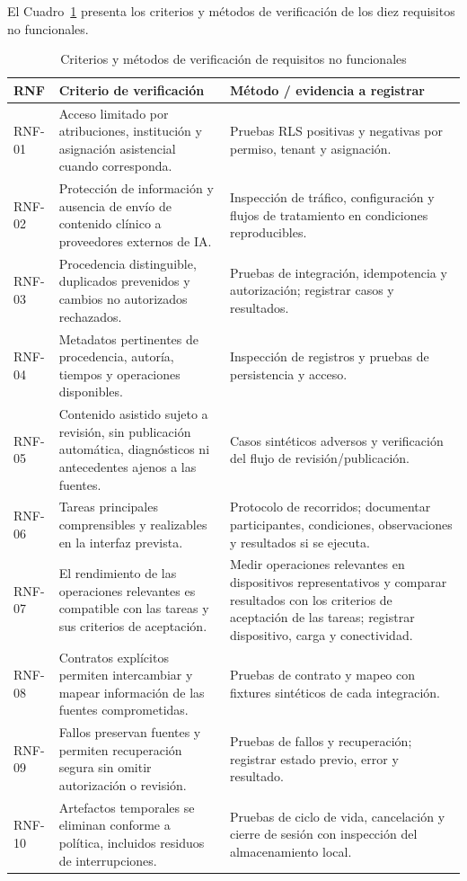 El Cuadro~\ref{tab:verificacion_rnf} presenta los criterios y métodos de verificación de los diez requisitos no funcionales.

\begin{table}[H]
    \caption{Criterios y métodos de verificación de requisitos no funcionales}
    \label{tab:verificacion_rnf}
    \begin{tabularx}{\textwidth}{|l|X|X|}
        \hline
        \textbf{RNF} & \textbf{Criterio de verificación} & \textbf{Método / evidencia a registrar} \\
        \hline
        RNF-01 & Acceso limitado por atribuciones, institución y asignación asistencial cuando corresponda. & Pruebas RLS positivas y negativas por permiso, tenant y asignación. \\
        \hline
        RNF-02 & Protección de información y ausencia de envío de contenido clínico a proveedores externos de IA. & Inspección de tráfico, configuración y flujos de tratamiento en condiciones reproducibles. \\
        \hline
        RNF-03 & Procedencia distinguible, duplicados prevenidos y cambios no autorizados rechazados. & Pruebas de integración, idempotencia y autorización; registrar casos y resultados. \\
        \hline
        RNF-04 & Metadatos pertinentes de procedencia, autoría, tiempos y operaciones disponibles. & Inspección de registros y pruebas de persistencia y acceso. \\
        \hline
        RNF-05 & Contenido asistido sujeto a revisión, sin publicación automática, diagnósticos ni antecedentes ajenos a las fuentes. & Casos sintéticos adversos y verificación del flujo de revisión/publicación. \\
        \hline
        RNF-06 & Tareas principales comprensibles y realizables en la interfaz prevista. & Protocolo de recorridos; documentar participantes, condiciones, observaciones y resultados si se ejecuta. \\
        \hline
        RNF-07 & El rendimiento de las operaciones relevantes es compatible con las tareas y sus criterios de aceptación. & Medir operaciones relevantes en dispositivos representativos y comparar resultados con los criterios de aceptación de las tareas; registrar dispositivo, carga y conectividad. \\
        \hline
        RNF-08 & Contratos explícitos permiten intercambiar y mapear información de las fuentes comprometidas. & Pruebas de contrato y mapeo con fixtures sintéticos de cada integración. \\
        \hline
        RNF-09 & Fallos preservan fuentes y permiten recuperación segura sin omitir autorización o revisión. & Pruebas de fallos y recuperación; registrar estado previo, error y resultado. \\
        \hline
        RNF-10 & Artefactos temporales se eliminan conforme a política, incluidos residuos de interrupciones. & Pruebas de ciclo de vida, cancelación y cierre de sesión con inspección del almacenamiento local. \\
        \hline
    \end{tabularx}
\end{table}

